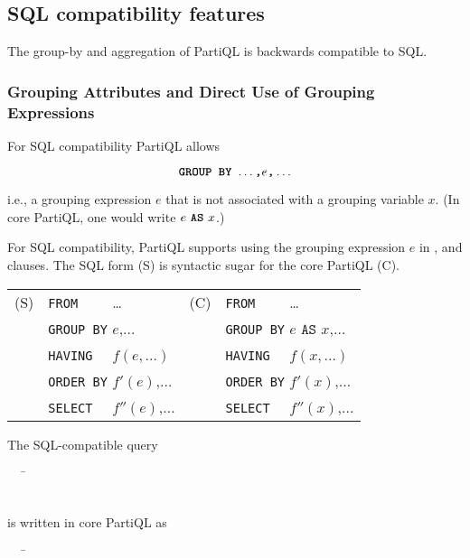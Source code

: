  
\subsection{SQL compatibility features} 
\label{sec:sql-groupby}
The group-by and aggregation of PartiQL is backwards compatible to SQL.

\subsubsection{Grouping Attributes and Direct Use of Grouping Expressions}
\label{sec:grouping-attributes}
For SQL compatibility PartiQL allows

\[\texttt{\textbf{GROUP BY}}\ \ldots\texttt{\textbf{,}} e\texttt{\textbf{,}} \ldots\]

\noindent i.e., a grouping expression $e$ that is not associated with a grouping
variable $x$. (In core PartiQL, one would write $e\ \gl{AS}\ x$.)

For SQL compatibility, PartiQL supports using the grouping expression $e$ in
,  and  clauses. The SQL form (S) is
syntactic sugar for the core PartiQL (C).

\begin{tabular}{@{}l@{~}l@{~}l@{~}l@{}}
(S) & \texttt{FROM ~~~} \ldots                          & (C)   & \texttt{FROM ~~~} \ldots \\
    & \texttt{GROUP BY} $e \texttt{,} \ldots$         &       & \texttt{GROUP BY} $e \texttt{ AS } x \texttt{,} \ldots$ \\
    & \texttt{HAVING ~} $f(e, \ldots)$                &       & \texttt{HAVING ~} $f(x, \ldots)$ \\
    & \texttt{ORDER BY} $f'(e) \texttt{,} \ldots$     &       & \texttt{ORDER BY} $f'(x) \texttt{,} \ldots$  \\
    & \texttt{SELECT ~} $f''(e) \texttt{,} \ldots$    &       & \texttt{SELECT ~} $f''(x) \texttt{,} \ldots$ \\
\end{tabular}

\begin{example}
The SQL-compatible query 
\begin{tabbing}
\ \ \ \=\\
\>\\
\>
\end{tabbing}
\noindent is written in core PartiQL as
\begin{tabbing}
\ \ \ \=\\
\>\\
\>
\end{tabbing}
\end{example}

